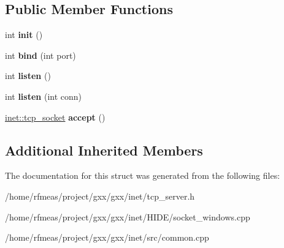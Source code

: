 \subsection*{Public Member Functions}
\begin{DoxyCompactItemize}
\item 
int {\bfseries init} ()\hypertarget{structgxx_1_1inet_1_1tcp__server_a8422f871d8ce8ed31ad15f717225e794}{}\label{structgxx_1_1inet_1_1tcp__server_a8422f871d8ce8ed31ad15f717225e794}

\item 
int {\bfseries bind} (int port)\hypertarget{structgxx_1_1inet_1_1tcp__server_a5c220218575656737bef848534653caf}{}\label{structgxx_1_1inet_1_1tcp__server_a5c220218575656737bef848534653caf}

\item 
int {\bfseries listen} ()\hypertarget{structgxx_1_1inet_1_1tcp__server_acaea51e277f5d516f4d868adcd7c9024}{}\label{structgxx_1_1inet_1_1tcp__server_acaea51e277f5d516f4d868adcd7c9024}

\item 
int {\bfseries listen} (int conn)\hypertarget{structgxx_1_1inet_1_1tcp__server_a693303450ff959596d2344c560ce31b1}{}\label{structgxx_1_1inet_1_1tcp__server_a693303450ff959596d2344c560ce31b1}

\item 
\hyperlink{structgxx_1_1inet_1_1tcp__socket}{inet\+::tcp\+\_\+socket} {\bfseries accept} ()\hypertarget{structgxx_1_1inet_1_1tcp__server_a923d6b47dcb299eef6304c57010333f9}{}\label{structgxx_1_1inet_1_1tcp__server_a923d6b47dcb299eef6304c57010333f9}

\end{DoxyCompactItemize}
\subsection*{Additional Inherited Members}


The documentation for this struct was generated from the following files\+:\begin{DoxyCompactItemize}
\item 
/home/rfmeas/project/gxx/gxx/inet/tcp\+\_\+server.\+h\item 
/home/rfmeas/project/gxx/gxx/inet/\+H\+I\+D\+E/socket\+\_\+windows.\+cpp\item 
/home/rfmeas/project/gxx/gxx/inet/src/common.\+cpp\end{DoxyCompactItemize}
